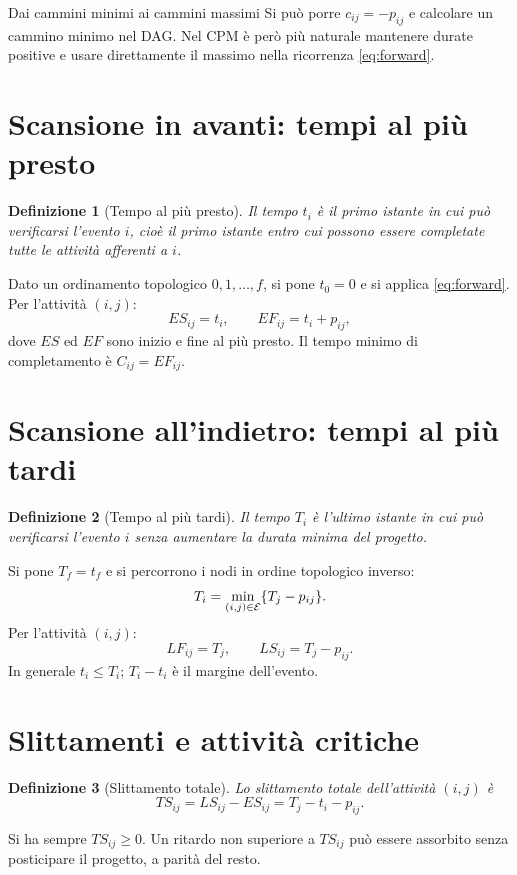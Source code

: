 \documentclass[11pt,a4paper]{article}
\newtheorem{definition}{Definizione}[section]\newtheorem{theorem}[definition]{Teorema}\newtheorem{proposition}[definition]{Proposizione}
\begin{document}
\begin{examplebox}{Dai cammini minimi ai cammini massimi}
Si può porre $c_{ij}=-p_{ij}$ e calcolare un cammino minimo nel DAG. Nel CPM è però più naturale mantenere durate positive e usare direttamente il massimo nella ricorrenza \eqref{eq:forward}.
\end{examplebox}

\section{Scansione in avanti: tempi al più presto}
\begin{definition}[Tempo al più presto]
Il tempo $t_i$ è il primo istante in cui può verificarsi l'evento $i$, cioè il primo istante entro cui possono essere completate tutte le attività afferenti a $i$.
\end{definition}
Dato un ordinamento topologico $0,1,\ldots,f$, si pone $t_0=0$ e si applica \eqref{eq:forward}. Per l'attività $(i,j)$:
\[ES_{ij}=t_i,\qquad EF_{ij}=t_i+p_{ij},\]
dove $ES$ ed $EF$ sono inizio e fine al più presto. Il tempo minimo di completamento è $C_{ij}=EF_{ij}$.

\section{Scansione all'indietro: tempi al più tardi}
\begin{definition}[Tempo al più tardi]
Il tempo $T_i$ è l'ultimo istante in cui può verificarsi l'evento $i$ senza aumentare la durata minima del progetto.
\end{definition}
Si pone $T_f=t_f$ e si percorrono i nodi in ordine topologico inverso:
\begin{equation}\label{eq:backward}
T_i=\min_{(i,j)\in\mathcal{E}}\{T_j-p_{ij}\}.
\end{equation}
Per l'attività $(i,j)$:
\[LF_{ij}=T_j,\qquad LS_{ij}=T_j-p_{ij}.\]
In generale $t_i\leq T_i$; $T_i-t_i$ è il margine dell'evento.

\section{Slittamenti e attività critiche}
\begin{definition}[Slittamento totale]
Lo slittamento totale dell'attività $(i,j)$ è
\begin{equation}\label{eq:slack}
TS_{ij}=LS_{ij}-ES_{ij}=T_j-t_i-p_{ij}.
\end{equation}
\end{definition}
Si ha sempre $TS_{ij}\geq0$. Un ritardo non superiore a $TS_{ij}$ può essere assorbito senza posticipare il progetto, a parità del resto.
\end{document}
